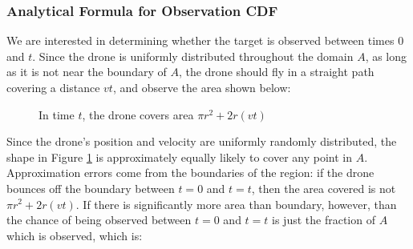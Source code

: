\documentclass{article}
\begin{document}
\subsubsection{Analytical Formula for Observation CDF}

We are interested in determining whether the target is observed between times $0$ and $t$.
Since the drone is uniformly distributed throughout the domain $A$, as long as it is
	not near the boundary of $A$, the drone should fly in a straight path covering a distance
	$v t$, and observe the area shown below:

\begin{figure}[h!]
\begin{center}
\end{center}
\label{fig:drone-coverage-area}
\caption{In time $t$, the drone covers area $\pi r^2 + 2 r (v t)$}
\end{figure}

Since the drone's position and velocity are uniformly randomly distributed,
	the shape in Figure \ref{fig:drone-coverage-area} is approximately equally likely to 
	cover any point in $A$.	
Approximation errors come from the boundaries of the region: if the drone bounces
	off the boundary between $t=0$ and $t=t$, then the area covered is not
	$\pi r^2 + 2 r (v t)$.
If there is significantly more area than boundary, however, than the chance of being 
	observed between $t=0$ and $t=t$ is just the fraction of $A$ which is observed,
	which is:
\end{document}
